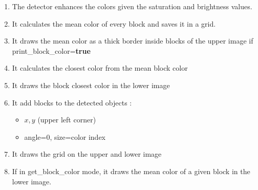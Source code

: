     \begin{enumerate}
        \item The detector enhances the colors given the saturation and 
                brightness values.
        \item It calculates the mean color of every block and saves it
            in a grid.
        \item It draws the mean color as a thick border inside blocks of 
            the upper image if print\_block\_color={\bf true}
        \item It calculates the closest color from the mean block color
        \item It draws the block closest color in the lower image 


        \item It add blocks to the detected objects :
        \begin{itemize}
            \label{sec:cgd:algo:blockattributs}
            \item $x,y$ (upper left corner)
            \item angle=0, size=color index
        \end{itemize}
        \item It draws the grid on the upper and lower image
        \item If in get\_block\_color mode, it draws the mean color of a 
            given block in the lower image.
    \end{enumerate}


